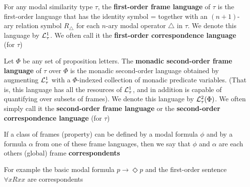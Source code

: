 \documentclass[11pt]{article}
\begin{document}
\begin{definition}
For any modal similarity type \(\tau\), the \textbf{first-order frame language} of \(\tau\) is the
first-order language that has the identity symbol = together with an
\((n+1)\)-ary relation symbol \(R_{\triangle}\) for each \(n\)-ary modal
operator \(\triangle\) in \(\tau\). We denote this language by \(\mathcal{L}_\tau^1\). We
often call it the \textbf{first-order correspondence language} (for \(\tau\))

Let \(\Phi\) be any set of proposition letters. The \textbf{monadic second-order frame
language} of \(\tau\) over \(\Phi\) is the monadic second-order language obtained by
augmenting \(\mathcal{L}_\tau^1\) with a \(\Phi\)-indexed collection of monadic
predicate variables. (That is, this language has all the resources of
\(\mathcal{L}_\tau^1\), and in addition is capable of quantifying over subsets of
frames). We denote this language by \(\mathcal{L}_\tau^2(\Phi)\). We often simply call it the
\textbf{second-order frame language} or the \textbf{second-order correspondence language} (for \(\tau\))
\end{definition}

\begin{definition}
If a class of frames (property) can be defined by a modal formula \(\phi\) and by a
formula \(\alpha\) from one of these frame languages, then we say that \(\phi\) and \(\alpha\) are
each others (global) frame \textbf{correspondents}
\end{definition}

For example the basic modal formula \(p\to\Diamond p\) and the first-order
sentence \(\forall xRxx\) are correspondents
\end{document}
